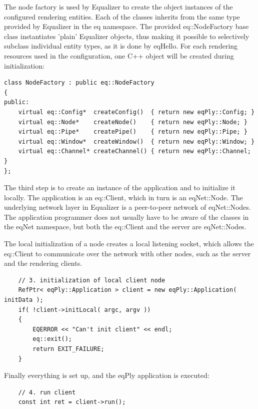 \documentclass[10pt,a4]{scrartcl}
\begin{document}
The node factory is used by Equalizer to create the object instances of
the configured rendering entities. Each of the classes inherits from the
same type provided by Equalizer in the \textsf{eq} namespace. The
provided \textsf{eq::NodeFactory} base class instantiates 'plain'
Equalizer objects, thus making it possible to selectively subclass
individual entity types, as it is done by \textsf{eqHello}. For each
rendering resources used in the configuration, one C++ object will be
created during initialization:

{\footnotesize\begin{lstlisting}
class NodeFactory : public eq::NodeFactory
{
public:
    virtual eq::Config*  createConfig()  { return new eqPly::Config; }
    virtual eq::Node*    createNode()    { return new eqPly::Node; }
    virtual eq::Pipe*    createPipe()    { return new eqPly::Pipe; }
    virtual eq::Window*  createWindow()  { return new eqPly::Window; }
    virtual eq::Channel* createChannel() { return new eqPly::Channel; }
};
\end{lstlisting}}

The third step is to create an instance of the application and to
initialize it locally. The application is an \textsf{eq::Client}, which
in turn is an \textsf{eqNet::Node}. The underlying network layer in
Equalizer is a peer-to-peer network of \textsf{eqNet::Node}s. The
application programmer does not usually have to be aware of the classes
in the \textsf{eqNet} namespace, but both the \textsf{eq::Client} and
the server are \textsf{eqNet::Node}s. 

The local initialization of a node creates a local listening socket,
which allows the \textsf{eq::Client} to communicate over the network
with other nodes, such as the server and the rendering clients.

{\footnotesize\begin{lstlisting}
    // 3. initialization of local client node
    RefPtr< eqPly::Application > client = new eqPly::Application( initData );
    if( !client->initLocal( argc, argv ))
    {
        EQERROR << "Can't init client" << endl;
        eq::exit();
        return EXIT_FAILURE;
    }
\end{lstlisting}}%

Finally everything is set up, and the \textsf{eqPly} application is executed:

{\footnotesize\begin{lstlisting}
    // 4. run client
    const int ret = client->run();
\end{lstlisting}}
\end{document}
